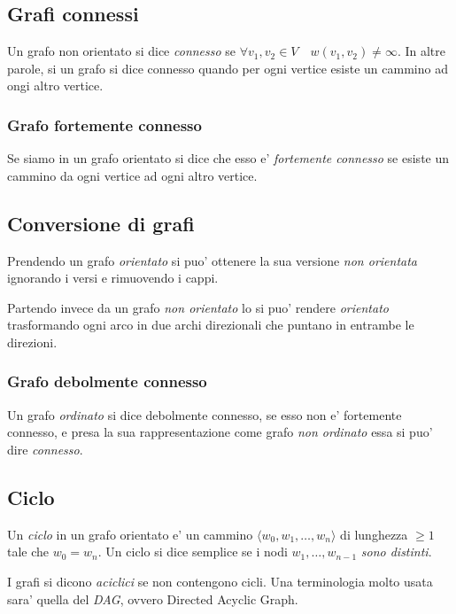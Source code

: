 \documentclass{article}
\begin{document}
\subsection{Grafi connessi}

Un grafo non orientato si dice \emph{connesso} se $\forall v_1, v_2 \in V \quad
w(v_1, v_2) \neq \infty$. In altre parole, si un grafo si dice
connesso quando per ogni vertice esiste un cammino ad ongi altro vertice.

\subsubsection{Grafo fortemente connesso}

Se siamo in un grafo orientato si dice che esso e' \emph{fortemente connesso} se
esiste un cammino da ogni vertice ad ogni altro vertice.

\subsection{Conversione di grafi}

Prendendo un grafo \emph{orientato} si puo' ottenere la sua versione \emph{non orientata}
ignorando i versi e rimuovendo i cappi. 

Partendo invece da un grafo \emph{non orientato} lo si puo' rendere \emph{orientato}
trasformando ogni arco in due archi direzionali che puntano in entrambe le direzioni.

\subsubsection{Grafo debolmente connesso}

Un grafo \emph{ordinato} si dice debolmente connesso, se esso non e' fortemente
connesso, e presa la sua rappresentazione come grafo \emph{non ordinato} essa
si puo' dire \emph{connesso}.

\subsection{Ciclo}

Un \emph{ciclo} in un grafo orientato e' un cammino $\langle w_0, w_1, \ldots, w_n\rangle$
di lunghezza $\geq 1$ tale che $w_0 = w_n$. Un ciclo si dice semplice se i nodi
$w_1, \ldots, w_{n-1}$ \emph{sono distinti}.

I grafi si dicono \emph{aciclici} se non contengono cicli. Una terminologia molto
usata sara' quella del \emph{DAG}, ovvero Directed Acyclic Graph.
\end{document}
